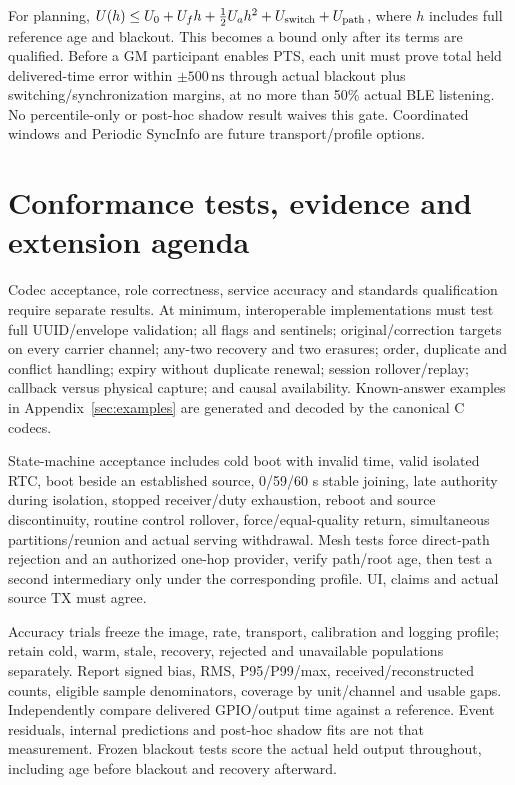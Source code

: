 \documentclass[11pt,letterpaper]{article}
\newcommand{\ns}{\,\mathrm{ns}}
\newcommand{\page}{\clearpage}
\begin{document}
For planning, $U(h)\le U_0+U_fh+\tfrac12U_ah^2+U_{\rm switch}+U_{\rm path}$, where $h$ includes full reference age and blackout. This becomes a bound only after its terms are qualified. Before a GM participant enables PTS, each unit must prove total held delivered-time error within $\pm500\ns$ through actual blackout plus switching/synchronization margins, at no more than 50\% actual BLE listening. No percentile-only or post-hoc shadow result waives this gate. Coordinated windows and Periodic SyncInfo are future transport/profile options.

\page
\section{Conformance tests, evidence and extension agenda}\label{sec:review}
Codec acceptance, role correctness, service accuracy and standards qualification require separate results. At minimum, interoperable implementations must test full UUID/envelope validation; all flags and sentinels; original/correction targets on every carrier channel; any-two recovery and two erasures; order, duplicate and conflict handling; expiry without duplicate renewal; session rollover/replay; callback versus physical capture; and causal availability. Known-answer examples in Appendix~\ref{sec:examples} are generated and decoded by the canonical C codecs.

State-machine acceptance includes cold boot with invalid time, valid isolated RTC, boot beside an established source, 0/59/60 s stable joining, late authority during isolation, stopped receiver/duty exhaustion, reboot and source discontinuity, routine control rollover, force/equal-quality return, simultaneous partitions/reunion and actual serving withdrawal. Mesh tests force direct-path rejection and an authorized one-hop provider, verify path/root age, then test a second intermediary only under the corresponding profile. UI, claims and actual source TX must agree.

Accuracy trials freeze the image, rate, transport, calibration and logging profile; retain cold, warm, stale, recovery, rejected and unavailable populations separately. Report signed bias, RMS, P95/P99/max, received/reconstructed counts, eligible sample denominators, coverage by unit/channel and usable gaps. Independently compare delivered GPIO/output time against a reference. Event residuals, internal predictions and post-hoc shadow fits are not that measurement. Frozen blackout tests score the actual held output throughout, including age before blackout and recovery afterward.
\end{document}
